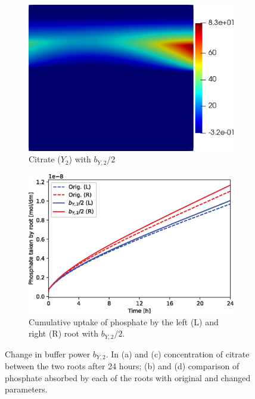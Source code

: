 \documentclass[11pt]{article}
\numberwithin{equation}{section}
\begin{document}
\begin{figure}[!htb]
\begin{subfigure}[t]{0.35\textwidth}
    \includegraphics[trim= 100 100 60 100,width=\textwidth]{Figures/Y2_bY2divby2.png}
    \caption{Citrate ($Y_2$) with $b_{Y,2} / 2$}
    \label{fig:numexp_by2down1}
\end{subfigure}
\hspace{1cm}
\begin{subfigure}[t]{0.4\textwidth}
    \includegraphics[width=\textwidth]{Figures/bY2divby2.eps}
    \caption{Cumulative uptake of phosphate by the left (L) and right (R) root with $b_{Y,2} / 2$.}
    \label{fig:numexp_by2down2}
\end{subfigure}
\caption{Change in buffer power $b_{Y,2}$. In (a) and (c) concentration of citrate between the two roots after 24 hours; (b) and (d) comparison of phosphate absorbed by each of the roots with original and changed parameters.}
\end{figure}
\end{document}
